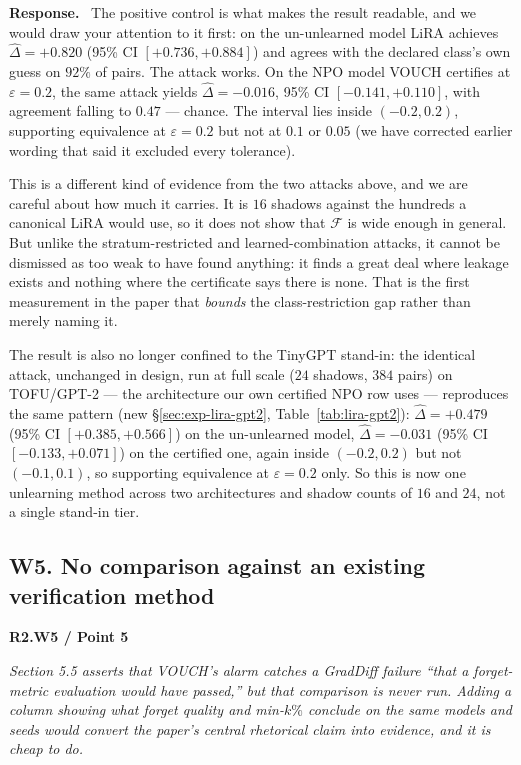 \documentclass[11pt,a4paper]{article}
\newcommand{\eps}{\varepsilon}
\newcommand{\F}{\mathcal{F}}
\newenvironment{point}[1]{%
  \par\medskip\noindent\textbf{\color{rcol}#1}\par\nopagebreak\smallskip\begingroup
  \color{rcol}\itshape}{\endgroup\par}
\newenvironment{reply}{%
  \par\smallskip\noindent\textbf{\color{acol}Response.}\ \begingroup}{\endgroup\par}
\begin{document}
\begin{reply}
The positive control is what makes the result readable, and we would draw your
attention to it first: on the un-unlearned model LiRA achieves
$\hat\Delta = +0.820$ (95\% CI $[+0.736,+0.884]$) and agrees with the declared class's
own guess on $92\%$ of pairs. The attack works. On the NPO model VOUCH certifies at
$\eps = 0.2$, the same attack yields $\hat\Delta = -0.016$, 95\% CI
$[-0.141,+0.110]$, with agreement falling to $0.47$ --- chance. The interval lies inside
$(-0.2,0.2)$, supporting equivalence at $\eps=0.2$ but not at $0.1$ or $0.05$ (we have
corrected earlier wording that said it excluded every tolerance).

This is a different kind of evidence from the two attacks above, and we are careful
about how much it carries. It is $16$ shadows against the hundreds a canonical LiRA
would use, so it does not show that $\F$ is wide enough in general. But unlike the
stratum-restricted and learned-combination attacks, it cannot be dismissed as too weak
to have found anything: it finds a great deal where leakage exists and nothing where
the certificate says there is none. That is the first measurement in the paper that
\emph{bounds} the class-restriction gap rather than merely naming it.

The result is also no longer confined to the TinyGPT stand-in: the identical attack,
unchanged in design, run at full scale ($24$ shadows, $384$ pairs) on TOFU/GPT-2 ---
the architecture our own certified NPO row uses --- reproduces the same pattern (new
\S\ref{sec:exp-lira-gpt2}, Table~\ref{tab:lira-gpt2}): $\hat\Delta = +0.479$
(95\% CI $[+0.385,+0.566]$) on the un-unlearned model, $\hat\Delta = -0.031$
(95\% CI $[-0.133,+0.071]$) on the certified one, again inside $(-0.2,0.2)$ but not $(-0.1,0.1)$, so supporting equivalence at
$\eps=0.2$ only. So this is now one unlearning method across two architectures and shadow
counts of $16$ and $24$, not a single stand-in tier.
\end{reply}

\subsection*{W5. No comparison against an existing verification method}

\begin{point}{R2.W5 / Point 5}
Section 5.5 asserts that VOUCH's alarm catches a GradDiff failure ``that a forget-metric
evaluation would have passed,'' but that comparison is never run. Adding a column
showing what forget quality and min-$k\%$ conclude on the same models and seeds would
convert the paper's central rhetorical claim into evidence, and it is cheap to do.
\end{point}
\end{document}
